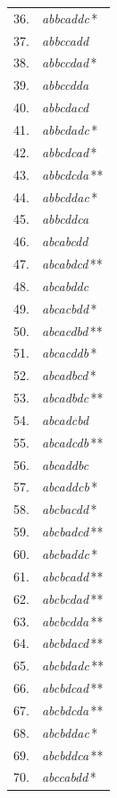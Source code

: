 \begin{center}
\begin{minipage}[t]{.31\linewidth}
\begin{tabular}{r@{\ }l}
\end{tabular}\end{minipage}\hfill%
\begin{minipage}[t]{.31\linewidth}\centering
\begin{tabular}{r@{\ }l}
36. & \emph{abbcaddc}\,* \\
37. & \emph{abbccadd} \\
38. & \emph{abbccdad}\,* \\
39. & \emph{abbccdda} \\
40. & \emph{abbcdacd} \\
41. & \emph{abbcdadc}\,* \\
42. & \emph{abbcdcad}\,* \\
43. & \emph{abbcdcda}\,** \\
44. & \emph{abbcddac}\,* \\
45. & \emph{abbcddca} \\
46. & \emph{abcabcdd} \\
47. & \emph{abcabdcd}\,** \\
48. & \emph{abcabddc} \\
49. & \emph{abcacbdd}\,* \\
50. & \emph{abcacdbd}\,** \\
51. & \emph{abcacddb}\,* \\
52. & \emph{abcadbcd}\,* \\
53. & \emph{abcadbdc}\,** \\
54. & \emph{abcadcbd} \\
55. & \emph{abcadcdb}\,** \\
56. & \emph{abcaddbc} \\
57. & \emph{abcaddcb}\,* \\
58. & \emph{abcbacdd}\,* \\
59. & \emph{abcbadcd}\,** \\
60. & \emph{abcbaddc}\,* \\
61. & \emph{abcbcadd}\,** \\
62. & \emph{abcbcdad}\,** \\
63. & \emph{abcbcdda}\,** \\
64. & \emph{abcbdacd}\,** \\
65. & \emph{abcbdadc}\,** \\
66. & \emph{abcbdcad}\,** \\
67. & \emph{abcbdcda}\,** \\
68. & \emph{abcbddac}\,* \\
69. & \emph{abcbddca}\,** \\
70. & \emph{abccabdd}\,* \\

\end{tabular}
\end{minipage}
\end{center}
